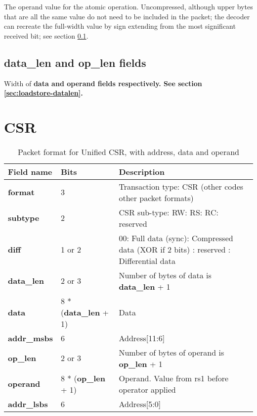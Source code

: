 The operand value for the atomic operation.  Uncompressed, although upper bytes 
that are all the same value do not need to be included in the packet; the decoder can recreate the 
full-width value by sign extending from the most significant received bit; see section \ref{sec:atomic-datalen}.

\subsection{data\_len and op\_len fields} \label{sec:atomic-datalen}

Width of \textbf{data and \textbf{operand} fields respectively.
See section \ref{sec:loadstore-datalen}.}

\FloatBarrier
\section{CSR} \label{sec:data-csr}

\begin{table}[htp]
  \centering
  \caption{Packet format for Unified CSR, with address, data and operand}
  \label{tab:te_datadx0y10}
  \begin{tabulary}{\textwidth}{|l|p{38mm}|p{92mm}|}
    \hline
    {\bf Field name} & {\bf Bits} & {\bf Description} \\
    \hline
    \textbf{format} & 	3	& Transaction type: CSR\newline
		(other codes other packet formats)\\
    \hline
    \textbf{subtype} & 	2	& CSR sub-type: RW: RS: RC: reserved\\	
    \hline
    \textbf{diff} & 1 or 2 & 00: Full data (sync): Compressed data (XOR if 2 bits) : reserved : Differential data\\
    \hline
    \textbf{data\_len}	& 2 or 3 & Number of bytes of data is \textbf{data\_len} + 1\\
    \hline
    \textbf{data} & 8 * (\textbf{data\_len} + 1) & Data\\
    \hline
    \textbf{addr\_msbs} & 6  &	Address[11:6]\\
    \hline
    \textbf{op\_len} & 2 or 3  & Number of bytes of operand is \textbf{op\_len} + 1\\    
    \hline
    \textbf{operand}	& 8 * (\textbf{op\_len} + 1) & Operand.  Value from rs1 before operator applied\\
    \hline
    \textbf{addr\_lsbs} &  6 & Address[5:0] \\
    \hline
  \end{tabulary}
\end{table}

